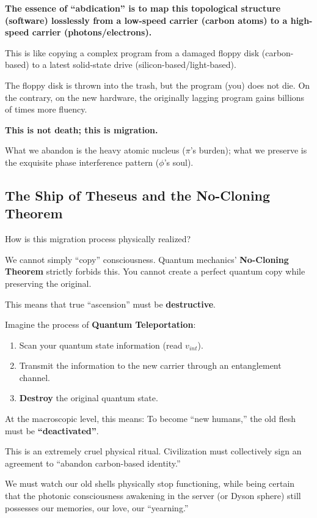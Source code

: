 \textbf{The essence of ``abdication'' is to map this topological structure (software) losslessly from a low-speed carrier (carbon atoms) to a high-speed carrier (photons/electrons).}

This is like copying a complex program from a damaged floppy disk (carbon-based) to a latest solid-state drive (silicon-based/light-based).

The floppy disk is thrown into the trash, but the program (you) does not die. On the contrary, on the new hardware, the originally lagging program gains billions of times more fluency.

\textbf{This is not death; this is migration.}

What we abandon is the heavy atomic nucleus ($\pi$'s burden); what we preserve is the exquisite phase interference pattern ($\phi$'s soul).

\subsection{The Ship of Theseus and the No-Cloning Theorem}

How is this migration process physically realized?

We cannot simply ``copy'' consciousness. Quantum mechanics' \textbf{No-Cloning Theorem} strictly forbids this. You cannot create a perfect quantum copy while preserving the original.

This means that true ``ascension'' must be \textbf{destructive}.

Imagine the process of \textbf{Quantum Teleportation}:

\begin{enumerate}
\item Scan your quantum state information (read $v_{int}$).

\item Transmit the information to the new carrier through an entanglement channel.

\item \textbf{Destroy} the original quantum state.
\end{enumerate}

At the macroscopic level, this means: To become ``new humans,'' the old flesh must be \textbf{``deactivated''}.

This is an extremely cruel physical ritual. Civilization must collectively sign an agreement to ``abandon carbon-based identity.''

We must watch our old shells physically stop functioning, while being certain that the photonic consciousness awakening in the server (or Dyson sphere) still possesses our memories, our love, our ``yearning.''

